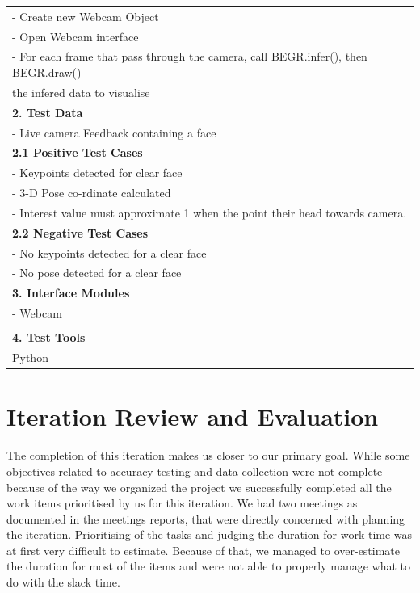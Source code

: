 \documentclass[12pt,a4paper,man]{report}
\begin{document}
\begin{longtable}{|p{7in}|}
- Create new Webcam Object\\
- Open Webcam interface\\
- For each frame that pass through the camera, call BEGR.infer(), then BEGR.draw()\\
the infered data to visualise\\
\hline
\textbf{2. Test Data}\\
\hline
- Live camera Feedback containing a face\\
\hline
\textbf{2.1 Positive Test Cases}\\
\hline
- Keypoints detected for clear face\\
- 3-D Pose co-rdinate calculated\\
- Interest value must approximate 1 when the point their head towards camera.\\
\hline
\textbf{2.2 Negative Test Cases}\\
\hline
- No keypoints detected for a clear face\\
- No pose detected for a clear face\\
\hline
\textbf{3. Interface Modules}\\
\hline
- Webcam\\
\\
\hline
\textbf{4. Test Tools}\\
\hline
Python\\
\hline
\end{longtable}



\section{Iteration Review and Evaluation}
\label{sec:orgc92f7ca}
The completion of this iteration makes us closer to our primary goal. While some objectives related to accuracy testing and data collection were not complete because of the way we organized the project we successfully completed all the work items prioritised by us for this iteration. We had two meetings as documented in the meetings reports, that were directly concerned with planning the iteration. Prioritising of the tasks and judging the duration for work time was at first very difficult to estimate. Because of that, we managed to over-estimate the duration for most of the items and were not able to properly manage what to do with the slack time.
\end{document}
